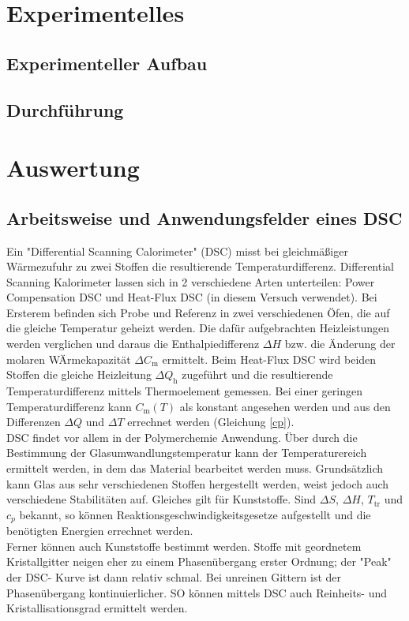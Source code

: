 \documentclass[a4paper,12pt,oneside,onecolum,final,openany]{report}
\begin{document}
\chapter{Experimentelles}
\section{Experimenteller Aufbau}

\section{Durchführung}

\chapter{Auswertung}
\section{Arbeitsweise und Anwendungsfelder eines DSC}
Ein "Differential Scanning Calorimeter" (DSC) misst bei gleichmäßiger Wärmezufuhr zu zwei Stoffen die resultierende Temperaturdifferenz.
Differential Scanning Kalorimeter lassen sich in 2 verschiedene Arten unterteilen: Power Compensation DSC und Heat-Flux DSC (in diesem Versuch verwendet). Bei Ersterem befinden sich Probe und Referenz in zwei verschiedenen Öfen, die auf die gleiche Temperatur geheizt werden. Die dafür aufgebrachten Heizleistungen werden verglichen und daraus die Enthalpiedifferenz $\Delta H$ bzw. die Änderung der molaren WÄrmekapazität $\Delta C_\mathrm{m}$ ermittelt.
Beim Heat-Flux DSC wird beiden Stoffen die gleiche Heizleitung $\Delta Q_\mathrm{h}$ zugeführt und die resultierende Temperaturdifferenz mittels Thermoelement gemessen.
Bei einer geringen Temperaturdifferenz kann $C_\mathrm{m}(T)$ als konstant angesehen werden und aus den Differenzen $\Delta Q$ und $\Delta T$ errechnet werden (Gleichung \ref{cp}).\\

DSC findet vor allem in der Polymerchemie Anwendung. Über durch die Bestimmung der Glasumwandlungstemperatur kann der Temperaturereich ermittelt werden, in dem das Material bearbeitet werden muss. Grundsätzlich kann Glas aus sehr verschiedenen Stoffen hergestellt werden, weist jedoch auch verschiedene Stabilitäten auf. Gleiches gilt für Kunststoffe. 
Sind $\Delta S$, $\Delta H$, $T_\mathrm{tr}$ und $c_p$ bekannt, so können Reaktionsgeschwindigkeitsgesetze aufgestellt und die benötigten Energien errechnet werden.\\ 
Ferner können auch Kunststoffe bestimmt werden.
Stoffe mit geordnetem Kristallgitter neigen eher zu einem Phasenübergang erster Ordnung; der "Peak" der DSC- Kurve ist dann relativ schmal. Bei unreinen Gittern ist der Phasenübergang  kontinuierlicher. SO können mittels DSC auch Reinheits- und Kristallisationsgrad ermittelt werden.\\
\end{document}
